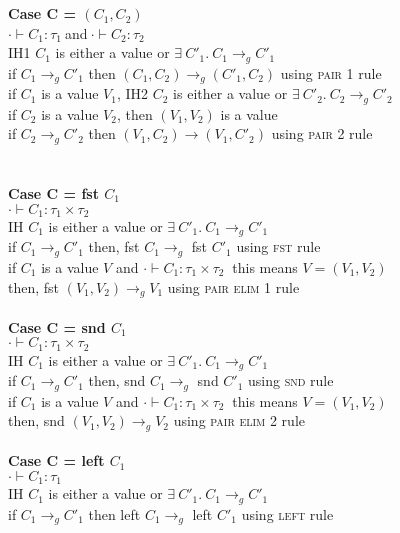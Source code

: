 \documentclass{article}
\begin{document}
\\ \\
\textbf{Case C = $(C_1,C_2)$} \\
$\cdot \vdash C_1: \tau_1\ $and$\ \cdot \vdash C_2: \tau_2\ $\\
IH1 $C_1$ is either a value or $  \exists \ C'_1.\ C_1 \to_g C'_1 $ \\
if $C_1 \to_g C'_1$ then $(C_1,C_2) \to_g (C'_1, C_2)$ using \textsc{pair 1} rule\\
if $C_1$ is a value $V_1$, IH2 $C_2$ is either a value or $  \exists \ C'_2.\ C_2 \to_g C'_2 $ \\
if $C_2$ is a value $V_2$, then $(V_1,V_2)$ is a value \\
if $C_2 \to_g C'_2$ then $(V_1,C_2) \to (V_1,C'_2)$ using \textsc{pair 2} rule \\ \\ \\
\textbf{Case C = fst $C_1$} \\
$\cdot \vdash C_1: \tau_1 \times \tau_2\ $\\
IH $C_1$ is either a value or $  \exists \ C'_1.\ C_1 \to_g C'_1 $ \\
if $C_1 \to_g C'_1$ then, fst $C_1 \to_g$ fst $C'_1$ using \textsc{fst} rule\\
if $C_1$ is a value $V$ and $\cdot \vdash C_1: \tau_1 \times \tau_2\ $ this means $V = (V_1, V_2)$ \\ 
then, fst $(V_1, V_2) \to_g V_1$ using \textsc{pair elim 1} rule\\ \\
\textbf{Case C = snd $C_1$} \\
$\cdot \vdash C_1: \tau_1 \times \tau_2\ $\\
IH $C_1$ is either a value or $  \exists \ C'_1.\ C_1 \to_g C'_1 $ \\
if $C_1 \to_g C'_1$ then, snd $C_1 \to_g$ snd $C'_1$ using \textsc{snd} rule\\
if $C_1$ is a value $V$ and $\cdot \vdash C_1: \tau_1 \times \tau_2\ $ this means $V = (V_1, V_2)$ \\ 
then, snd $(V_1, V_2) \to_g V_2$ using \textsc{pair elim 2} rule\\ \\
\textbf{Case C = left $C_1$} \\
$\cdot \vdash C_1: \tau_1$\\
IH $C_1$ is either a value or $  \exists \ C'_1.\ C_1 \to_g C'_1 $ \\
if $C_1 \to_g C'_1$ then left $C_1 \to_g$ left $C'_1$ using \textsc{left} rule\\
\end{document}
